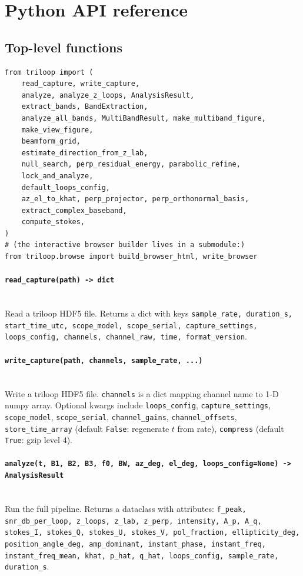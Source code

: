 \documentclass[11pt]{article}
\begin{document}
\section{Python API reference}

\subsection{Top-level functions}

\begin{lstlisting}[style=py]
from triloop import (
    read_capture, write_capture,
    analyze, analyze_z_loops, AnalysisResult,
    extract_bands, BandExtraction,
    analyze_all_bands, MultiBandResult, make_multiband_figure,
    make_view_figure,
    beamform_grid,
    estimate_direction_from_z_lab,
    null_search, perp_residual_energy, parabolic_refine,
    lock_and_analyze,
    default_loops_config,
    az_el_to_khat, perp_projector, perp_orthonormal_basis,
    extract_complex_baseband,
    compute_stokes,
)
# (the interactive browser builder lives in a submodule:)
from triloop.browse import build_browser_html, write_browser
\end{lstlisting}

\paragraph{\texttt{read\_capture(path) -> dict}}\quad\\
Read a triloop HDF5 file.  Returns a dict with keys
\texttt{sample\_rate, duration\_s, start\_time\_utc, scope\_model,
scope\_serial, capture\_settings, loops\_config, channels,
channel\_raw, time, format\_version}.

\paragraph{\texttt{write\_capture(path, channels, sample\_rate, ...)}}\quad\\
Write a triloop HDF5 file.  \texttt{channels} is a dict mapping
channel name to 1-D numpy array.  Optional kwargs include
\texttt{loops\_config}, \texttt{capture\_settings}, \texttt{scope\_model},
\texttt{scope\_serial}, \texttt{channel\_gains}, \texttt{channel\_offsets},
\texttt{store\_time\_array} (default \texttt{False}: regenerate $t$ from rate),
\texttt{compress} (default \texttt{True}: gzip level 4).

\paragraph{\texttt{analyze(t, B1, B2, B3, f0, BW, az\_deg, el\_deg, loops\_config=None) -> AnalysisResult}}\quad\\
Run the full pipeline.  Returns a dataclass with attributes:
\texttt{f\_peak, snr\_db\_per\_loop, z\_loops, z\_lab, z\_perp,
intensity, A\_p, A\_q, stokes\_I, stokes\_Q, stokes\_U, stokes\_V,
pol\_fraction, ellipticity\_deg, position\_angle\_deg, amp\_dominant,
instant\_phase, instant\_freq, instant\_freq\_mean,
khat, p\_hat, q\_hat, loops\_config, sample\_rate, duration\_s}.
\end{document}
